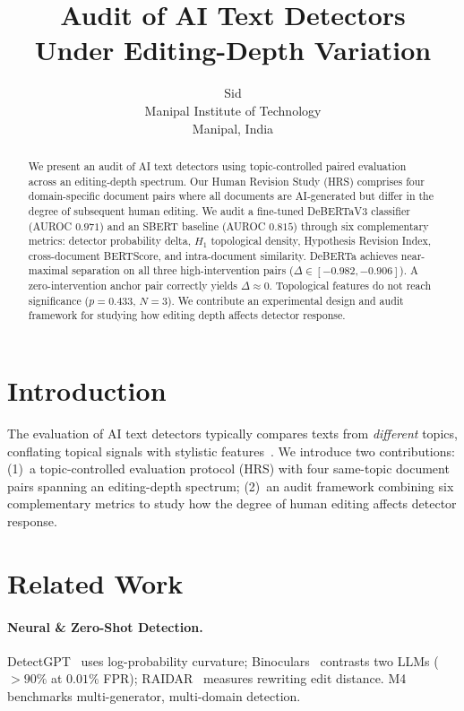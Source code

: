 \documentclass[11pt]{article}
\title{Audit of AI Text Detectors \\Under Editing-Depth Variation}
\author{
  Sid \\
  Manipal Institute of Technology \\
  Manipal, India \\
}
\begin{document}
\maketitle

\begin{abstract}
We present an audit of AI text detectors using topic-controlled paired evaluation across an editing-depth spectrum. Our Human Revision Study (HRS) comprises four domain-specific document pairs where all documents are AI-generated but differ in the degree of subsequent human editing. We audit a fine-tuned DeBERTaV3 classifier (AUROC $0.971$) and an SBERT baseline (AUROC $0.815$) through six complementary metrics: detector probability delta, $H_1$ topological density, Hypothesis Revision Index, cross-document BERTScore, and intra-document similarity. DeBERTa achieves near-maximal separation on all three high-intervention pairs ($\Delta \in [-0.982, -0.906]$). A zero-intervention anchor pair correctly yields $\Delta \approx 0$. Topological features do not reach significance ($p = 0.433$, $N = 3$). We contribute an experimental design and audit framework for studying how editing depth affects detector response.
\end{abstract}

\section{Introduction}

The evaluation of AI text detectors typically compares texts from \emph{different} topics, conflating topical signals with stylistic features~\cite{wang2024m4}. We introduce two contributions: (1)~a topic-controlled evaluation protocol (HRS) with four same-topic document pairs spanning an editing-depth spectrum; (2)~an audit framework combining six complementary metrics to study how the degree of human editing affects detector response.

\section{Related Work}

\paragraph{Neural \& Zero-Shot Detection.}
DetectGPT~\cite{mitchell2023detectgpt} uses log-probability curvature; Binoculars~\cite{hans2024binoculars} contrasts two LLMs ($>90\%$ at $0.01\%$ FPR); RAIDAR~\cite{mao2024raidar} measures rewriting edit distance. M4~\cite{wang2024m4} benchmarks multi-generator, multi-domain detection.
\end{document}

